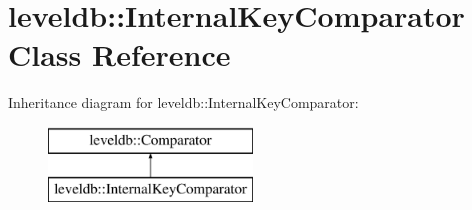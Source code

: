 \hypertarget{classleveldb_1_1_internal_key_comparator}{}\section{leveldb\+:\+:Internal\+Key\+Comparator Class Reference}
\label{classleveldb_1_1_internal_key_comparator}
Inheritance diagram for leveldb\+:\+:Internal\+Key\+Comparator\+:\begin{figure}[H]
\begin{center}
\leavevmode
\includegraphics[height=2.000000cm]{classleveldb_1_1_internal_key_comparator}
\end{center}
\end{figure}
